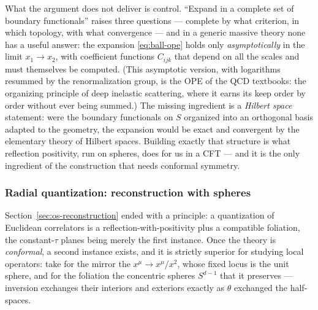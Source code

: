 What the argument does not deliver is control. ``Expand in a complete set
of boundary functionals'' raises three questions --- complete by what
criterion, in which topology, with what convergence --- and in a generic
massive theory none has a useful answer: the expansion
\eqref{eq:ball-ope} holds only \emph{asymptotically} in the limit $x_1 \to
x_2$, with coefficient functions $C_{ijk}$ that depend on all the scales
and must themselves be computed. (This asymptotic version, with logarithms
resummed by the renormalization group, is the OPE of the QCD textbooks: the
organizing principle of deep inelastic scattering, where it earns its keep
order by order without ever being summed.) The missing ingredient is a
\emph{Hilbert space} statement: were the boundary functionals on $S$
organized into an orthogonal basis adapted to the geometry, the
expansion would be exact and convergent by the elementary theory of Hilbert
spaces. Building exactly that structure is what reflection positivity, run
on spheres, does for us in a CFT --- and it is the only ingredient of the
construction that needs conformal symmetry.

\subsubsection{Radial quantization: reconstruction with spheres}
\label{sec:radial-quantization}

Section~\ref{sec:os-reconstruction} ended with a principle: a quantization of
Euclidean correlators is a reflection-with-positivity plus a compatible
foliation, the constant-$\tau$ planes being merely the first instance. Once
the theory is \emph{conformal}, a second instance exists, and it is strictly
superior for studying local operators: take for the mirror the
 $x^\mu \to x^\mu/x^2$, whose fixed locus is the unit
sphere, and for the foliation the concentric spheres $S^{d-1}$ that it
preserves --- inversion exchanges their interiors and exteriors exactly as
$\theta$ exchanged the half-spaces.


